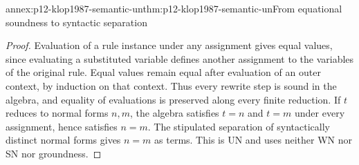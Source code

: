 \begin{annexitem}{annex:p12-klop1987-semantic-un}{thm:p12-klop1987-semantic-un}{From equational soundness to syntactic separation}
\begin{proof}
Evaluation of a rule instance under any assignment gives equal values,
since evaluating a substituted variable defines another assignment to
the variables of the original rule. Equal values remain equal after
evaluation of an outer context, by induction on that context. Thus every
rewrite step is sound in the algebra, and equality of evaluations is
preserved along every finite reduction. If \(t\) reduces to normal
forms \(n,m\), the algebra satisfies \(t=n\) and \(t=m\)
under every assignment, hence satisfies \(n=m\). The stipulated
separation of syntactically distinct normal forms gives \(n=m\)
as terms. This is UN and uses neither WN nor SN nor groundness.
\end{proof}
\end{annexitem}

